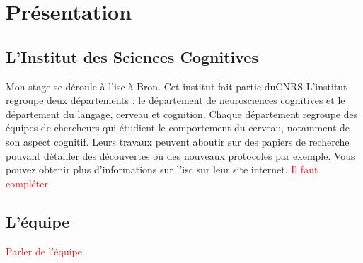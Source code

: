 \section{Présentation}

\subsection{L'Institut des Sciences Cognitives}

Mon stage se déroule à l'\gls{isc} à Bron. Cet institut fait partie du\gls{CNRS} L'institut regroupe deux départements : le département de neurosciences cognitives et le département du langage, cerveau et cognition.
Chaque département regroupe des équipes de chercheurs qui étudient le comportement du cerveau, notamment de son aspect cognitif. Leurs travaux peuvent aboutir sur des papiers de
recherche pouvant détailler des découvertes ou des nouveaux protocoles par exemple. Vous pouvez obtenir plus d'informations sur l'\gls{isc} sur leur site internet\cite{ISC00}.
\textcolor{red}{Il faut compléter}

\subsection{L'équipe}\textcolor{red}{Parler de l'équipe}


\newpage